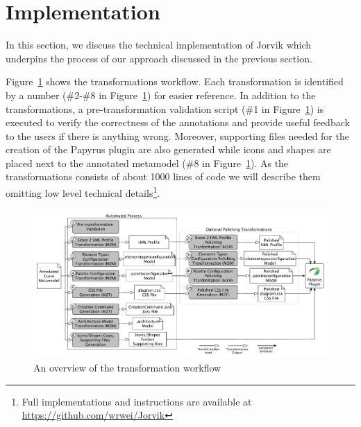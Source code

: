 \section{Implementation}
\label{sec:implementation}
In this section, we discuss the technical implementation of Jorvik which underpins the process of our approach discussed in the previous section. 

Figure~\ref{fig:transformationWorkflow} shows the transformations workflow. 
Each transformation is identified by a number (\#2-\#8 in Figure~\ref{fig:transformationWorkflow}) for easier reference. 
In addition to the transformations, a pre-transformation validation script (\#1 in Figure~\ref{fig:transformationWorkflow}) is executed to verify the correctness of the annotations and provide useful feedback to the users if there is anything wrong. 
Moreover, supporting files needed for the creation of the Papyrus plugin are also generated while icons and shapes are placed next to the annotated metamodel (\#8 in Figure~\ref{fig:transformationWorkflow}). 
As the transformations consists of about 1000 lines of code we will describe them omitting low level technical details\footnote{Full implementations and instructions are available at \url{https://github.com/wrwei/Jorvik}}. 

\begin{figure}[ht!]
	\centering
	\includegraphics[width=1\textwidth]{diagrams/transformationWorkflow.pdf}
	\caption[]{An overview of the transformation workflow}
	\label{fig:transformationWorkflow}
\end{figure}


